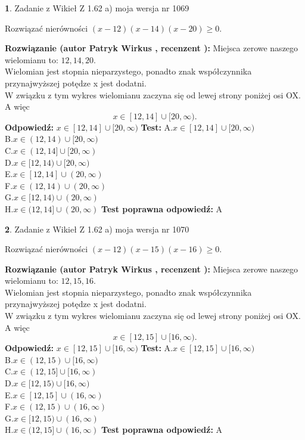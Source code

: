 \documentclass[12pt, a4paper]{article}
\theoremstyle{definition} %
\newtheorem{zad}{}
\newcommand{\zadStart}[1]{\begin{zad}#1\newline}
\newcommand{\zadStop}{\end{zad}}
\newcommand{\rozwStart}[2]{\noindent \textbf{Rozwiązanie (autor #1 , recenzent #2): }\newline}
\newcommand{\rozwStop}{\newline}
\newcommand{\odpStart}{\noindent \textbf{Odpowiedź:}\newline}
\newcommand{\odpStop}{\newline}
\newcommand{\testStart}{\noindent \textbf{Test:}\newline}
\newcommand{\testStop}{\newline}
\newcommand{\kluczStart}{\noindent \textbf{Test poprawna odpowiedź:}\newline}
\newcommand{\kluczStop}{\newline}
\begin{document}
\zadStart{Zadanie z Wikieł Z 1.62 a) moja wersja nr 1069}

Rozwiązać nierówności $(x-12)(x-14)(x-20)\ge0$.
\zadStop
\rozwStart{Patryk Wirkus}{}
Miejsca zerowe naszego wielomianu to: $12, 14, 20$.\\
Wielomian jest stopnia nieparzystego, ponadto znak współczynnika przy\linebreak najwyższej potędze x jest dodatni.\\ W związku z tym wykres wielomianu zaczyna się od lewej strony poniżej osi OX. A więc $$x \in [12,14] \cup [20,\infty).$$
\rozwStop
\odpStart
$x \in [12,14] \cup [20,\infty)$
\odpStop
\testStart
A.$x \in [12,14] \cup [20,\infty)$\\
B.$x \in (12,14) \cup [20,\infty)$\\
C.$x \in (12,14] \cup [20,\infty)$\\
D.$x \in [12,14) \cup [20,\infty)$\\
E.$x \in [12,14] \cup (20,\infty)$\\
F.$x \in (12,14) \cup (20,\infty)$\\
G.$x \in [12,14) \cup (20,\infty)$\\
H.$x \in (12,14] \cup (20,\infty)$
\testStop
\kluczStart
A
\kluczStop



\zadStart{Zadanie z Wikieł Z 1.62 a) moja wersja nr 1070}

Rozwiązać nierówności $(x-12)(x-15)(x-16)\ge0$.
\zadStop
\rozwStart{Patryk Wirkus}{}
Miejsca zerowe naszego wielomianu to: $12, 15, 16$.\\
Wielomian jest stopnia nieparzystego, ponadto znak współczynnika przy\linebreak najwyższej potędze x jest dodatni.\\ W związku z tym wykres wielomianu zaczyna się od lewej strony poniżej osi OX. A więc $$x \in [12,15] \cup [16,\infty).$$
\rozwStop
\odpStart
$x \in [12,15] \cup [16,\infty)$
\odpStop
\testStart
A.$x \in [12,15] \cup [16,\infty)$\\
B.$x \in (12,15) \cup [16,\infty)$\\
C.$x \in (12,15] \cup [16,\infty)$\\
D.$x \in [12,15) \cup [16,\infty)$\\
E.$x \in [12,15] \cup (16,\infty)$\\
F.$x \in (12,15) \cup (16,\infty)$\\
G.$x \in [12,15) \cup (16,\infty)$\\
H.$x \in (12,15] \cup (16,\infty)$
\testStop
\kluczStart
A
\kluczStop
\end{document}
